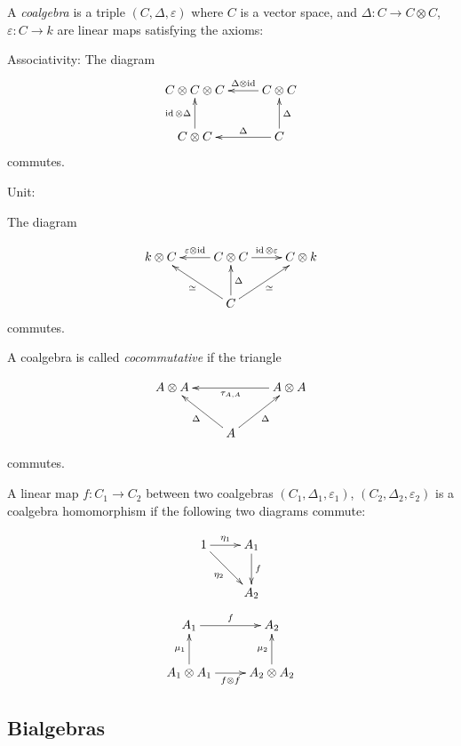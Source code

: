 \begin{defn}
    A \emph{coalgebra} is a triple $(C, \Delta, \varepsilon)$ where $C$ is a
    vector space, and $\Delta: C \to C \otimes C$, $\varepsilon: C \to k$ are
    linear maps satisfying the axioms:

Associativity:
The diagram
\begin{equation}
\xymatrix{
C \otimes C \otimes C   & C \otimes C \ar[l]_-{\Delta \otimes \id}\\
 C \otimes C\ar[u]^-{\id \otimes \Delta}  & C \ar[l]_-\Delta \ar[u]_-{\Delta}
}
\end{equation}
commutes.

Unit: 

The diagram

\begin{equation}
    \xymatrix{
    k \otimes C  & C \otimes C \ar[l]_-{\varepsilon \otimes \id} \ar[r]^-{\id \otimes \varepsilon} & C \otimes k   \\
    & C \ar[u]_-\Delta \ar[lu]^-\simeq \ar[ru]_-{\simeq}&
    }
\end{equation}
commutes.
\end{defn}
A coalgebra is called \emph{cocommutative} if the triangle 

\begin{equation}
    \xymatrix{
    A \otimes A   & & A \ar[ll]^-{\tau_{A,A}} \otimes A  \\
    & \ar[lu]^-\Delta A \ar[ru]_-\Delta&
    }
\end{equation}

commutes.

A linear map $f: C_1 \to C_2$ between two coalgebras $(C_1, \Delta_1,
\varepsilon_1)$, $(C_2, \Delta_2, \varepsilon_2)$ is a coalgebra homomorphism
if the following two diagrams commute: 


\begin{equation}
    \xymatrix{
    1 \ar[r]^-{\eta_1} \ar[rd]_{\eta_2} & A_1 \ar[d]^-f \\
    & A_2
    }
\end{equation}
\begin{equation}
    \xymatrix{
    A_1 \ar[r]^-f & A_2 \\
    A_1 \otimes A_1 \ar[u]^-{\mu_1} \ar[r]_-{f\otimes f} & A_2 \otimes A_2 \ar[u]^-{\mu_2}
    }
\end{equation}



\subsection{Bialgebras}

